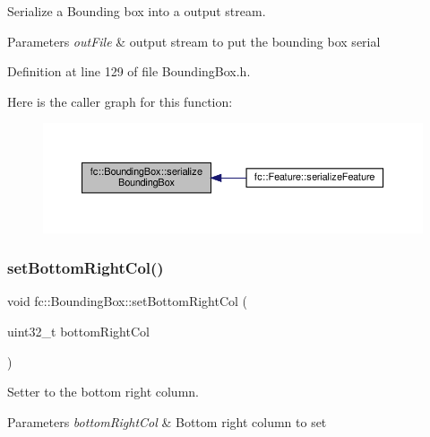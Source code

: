 Serialize a Bounding box into a output stream. 


\begin{DoxyParams}{Parameters}
{\em out\+File} & output stream to put the bounding box serial \\
\hline
\end{DoxyParams}


Definition at line 129 of file Bounding\+Box.\+h.

Here is the caller graph for this function\+:
\nopagebreak
\begin{figure}[H]
\begin{center}
\leavevmode
\includegraphics[width=350pt]{db/dc1/classfc_1_1BoundingBox_ae2174abc444c26d86763567ed31c5094_icgraph}
\end{center}
\end{figure}
\mbox{\label{classfc_1_1BoundingBox_af24b7c088410245b0aa492cf0b200e2e}} 
\subsubsection{\texorpdfstring{set\+Bottom\+Right\+Col()}{setBottomRightCol()}}
{\footnotesize\ttfamily void fc\+::\+Bounding\+Box\+::set\+Bottom\+Right\+Col (\begin{DoxyParamCaption}\item[{uint32\+\_\+t}]{bottom\+Right\+Col }\end{DoxyParamCaption})\hspace{0.3cm}{\ttfamily [inline]}}



Setter to the bottom right column. 


\begin{DoxyParams}{Parameters}
{\em bottom\+Right\+Col} & Bottom right column to set \\
\hline
\end{DoxyParams}


